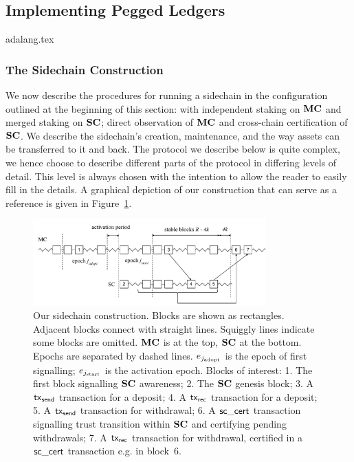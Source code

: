\subsection{Implementing Pegged Ledgers}
\label{sec:construction}




{adalang.tex}

\subsubsection{The Sidechain Construction}
\label{sec:const}

We now describe the procedures for running a sidechain in the configuration
outlined at the beginning of this section: with independent staking on $\mathbf{MC}$ and
merged staking on $\mathbf{SC}$; direct observation of $\mathbf{MC}$ and
cross-chain certification of $\mathbf{SC}$.
We describe the sidechain's creation,
maintenance, and the way assets can be  transferred to it and back.  The
protocol we describe below is quite complex,
we hence choose to describe different parts of the protocol in
differing levels of detail. This level is always chosen with the intention to allow the
reader to easily fill in the details.
A graphical depiction of our construction that can serve as a reference
is given in Figure~\ref{fig:sidechain}.
\begin{figure}[tb]%
  \centering
  \includegraphics[width=0.8\textwidth]{chapters/sidechains/figures/sidechains-overview.pdf}
  \caption{
  Our sidechain construction. Blocks are shown as rectangles. Adjacent blocks
  connect with straight lines. Squiggly lines indicate some blocks are omitted.
  $\mathbf{MC}$ is at the top, $\mathbf{SC}$ at the bottom. Epochs are separated by dashed
  lines. $e_{j_\text{adopt}}$ is the epoch of first signalling;
  $e_{j_\text{start}}$ is the activation epoch. Blocks of interest: 1. The
  first block signalling $\mathbf{SC}$ awareness;
  2. The $\mathbf{SC}$ genesis block; 3. A $\mathsf{tx}_{\mathsf{send}}$
  transaction for a deposit; 4. A $\mathsf{tx}_{\mathsf{rec}}$ transaction for a
  deposit; 5. A $\mathsf{tx}_{\mathsf{send}}$ transaction for withdrawal; 6. A $\mathsf{sc\_cert}$
  transaction signalling trust transition within $\mathbf{SC}$ and certifying pending
  withdrawals; 7. A $\mathsf{tx}_{\mathsf{rec}}$ transaction for withdrawal, certified in a $\mathsf{sc\_cert}$
  transaction e.g. in block~6.
  }
  \label{fig:sidechain}
\end{figure}%


